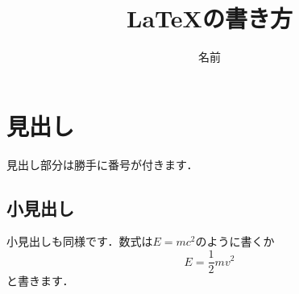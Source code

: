 \documentclass[11pt,a4paper,uplatex]{jsarticle}
\begin{document}
    \title{\LaTeX の書き方}
    \author{名前}
    \maketitle
        \section{見出し}
            見出し部分は勝手に番号が付きます．
                \subsection{小見出し}
                    小見出しも同様です．数式は$E=mc^{2}$のように書くか
                        \begin{equation}
                            E=\frac{1}{2}mv^{2}
                        \end{equation}
                    と書きます．
\end{document}
